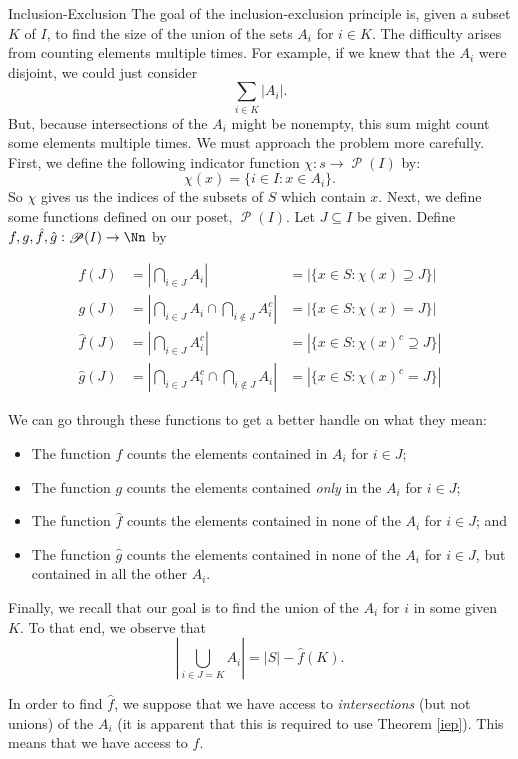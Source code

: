 \documentclass[12pt]{pom_thesis}
\DeclareMathOperator{\ps}{\mathscr{P}}
\begin{document}
\begin{chapter}{Inclusion-Exclusion}
The goal of the inclusion-exclusion principle is, given a subset $K$ of $I$, to find the size of the union of the sets $A_i$ for $i \in K$. The difficulty arises from counting elements multiple times. For example, if we knew that the $A_i$ were disjoint, we could just consider
\[
\sum_{i \in K}\left|A_i\right|.
\]
But, because intersections of the $A_i$ might be nonempty, this sum might count some elements multiple times. We must approach the problem more carefully. First, we define the following indicator function $\chi: s \rightarrow \ps(I)$ by:
\[
\chi(x) = \{i \in I : x \in A_i\}.
\]
So $\chi$ gives us the indices of the subsets of $S$ which contain $x$.  
Next, we define some functions defined on our poset, $\ps(I)$.
Let $J \subseteq I$ be given. Define $f,g,\hat{f}, \hat{g}:\ps(I) \rightarrow \Nn$ by

\begin{align*}
f(J) &= \left| \bigcap_{i \in J} A_i\right| &= |\{x \in S: \chi(x) \supseteq J\}|\\
g(J) &= \left| \bigcap_{i \in J} A_i \cap \bigcap_{i \notin J} A_i^c\right| &= |\{x \in S: \chi(x) = J\}|\\
\hat{f}(J) &= \left| \bigcap_{i \in J} A_i^c\right| &= |\{x \in S: \chi(x)^c \supseteq J\}|\\
\hat{g}(J) &= \left|\bigcap_{i \in J} A_i^c \cap \bigcap_{i \notin J} A_i \right| &= |\{x \in S: \chi(x)^c = J\}|
\end{align*}

We can go through these functions to get a better handle on what they mean:
\begin{itemize}
\item The function $f$ counts the elements contained in $A_i$ for $i \in J$;
\item The function $g$ counts the elements contained \emph{only} in the $A_i$ for $i \in J$;
\item The function $\hat{f}$ counts the elements contained in none of the $A_i$ for $i \in J$; and
\item The function $\hat{g}$ counts the elements contained in none of the $A_i$ for $i \in J$, but contained in all the other $A_i$.
\end{itemize}
Finally, we recall that our goal is to find the union of the $A_i$ for $i$ in some given $K$. To that end, we observe that
\[
\left| \bigcup_{i \in J=K} A_i \right| = |S| - \hat{f}(K).
\]

In order to find $\hat{f}$, we suppose that we have access to \emph{intersections} (but not unions) of the $A_i$ (it is apparent that this is required to use Theorem \ref{iep}). This means that we have access to $f$. 


\end{chapter}
\end{document}
